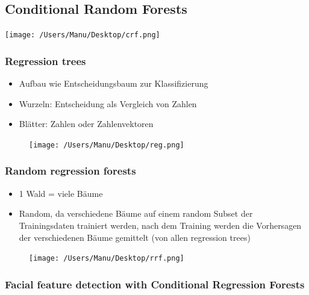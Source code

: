 \documentclass[paper=a4, fontsize=11pt]{scrartcl} %
\numberwithin{equation}{section} %
\numberwithin{figure}{section} %
\numberwithin{table}{section} %
\begin{document}
\subsection{Conditional Random Forests}

\texttt{[image: /Users/Manu/Desktop/crf.png]}

\subsubsection{Regression trees}

\begin{minipage}{0.65\textwidth}
\begin{itemize}
\item Aufbau wie Entscheidungsbaum zur Klassifizierung
\item Wurzeln: Entscheidung als Vergleich von Zahlen
\item Blätter: Zahlen oder Zahlenvektoren
\end{itemize}
\end{minipage} \hfill
\begin{minipage}{0.3\textwidth}
\begin{figure}[H]
\texttt{[image: /Users/Manu/Desktop/reg.png]}
\end{figure}
\end{minipage}

\subsubsection{Random regression forests}

\begin{minipage}{0.55\textwidth}
\begin{itemize}
\item 1 Wald = viele Bäume
\item Random, da verschiedene Bäume auf einem random Subset der Trainingsdaten trainiert werden, nach dem Training werden die Vorhersagen der verschiedenen Bäume gemittelt (von allen regression trees)
\end{itemize}
\end{minipage} \hfill
\begin{minipage}{0.4\textwidth}
\begin{figure}[H]
\texttt{[image: /Users/Manu/Desktop/rrf.png]}
\end{figure}
\end{minipage}

\subsubsection{Facial feature detection with Conditional Regression Forests}
\end{document}
